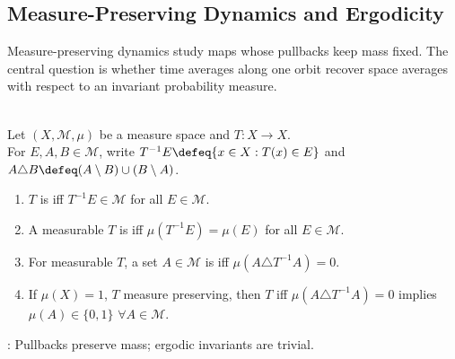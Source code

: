 \subsection{Measure-Preserving Dynamics and Ergodicity}

Measure-preserving dynamics study maps whose pullbacks keep mass fixed. The central question is whether time averages along one orbit recover space averages with respect to an invariant probability measure.

\begin{definition} \label{def:measure-preserving-and-ergodic-transformation} \\
Let $(X,\mathcal{M},\mu)$ be a measure space and $T:X\to X$.\\
For $E,A,B\in\mathcal{M}$, write $T^{-1}E\defeq\{x\in X:T(x)\in E\}$ and $A\triangle B\defeq(A\setminus B)\cup(B\setminus A)$.
\begin{enumerate}[label=(\roman*)]
\setlength{\itemsep}{0pt}
\item $T$ is  iff $T^{-1}E\in\mathcal{M}$ for all $E\in\mathcal{M}$.
\item A measurable $T$ is  iff $\mu(T^{-1}E)=\mu(E)$ for all $E\in\mathcal{M}$.
\item For measurable $T$, a set $A\in\mathcal{M}$ is  iff $\mu(A\triangle T^{-1}A)=0$.
\item If $\mu(X)=1$, $T$ measure preserving, then $T$  iff $\mu(A\triangle T^{-1}A)=0$ implies $\mu(A)\in\{0,1\}$ $\forall A\in\mathcal{M}$.
\end{enumerate}
: Pullbacks preserve mass; ergodic invariants are trivial.
\end{definition}

